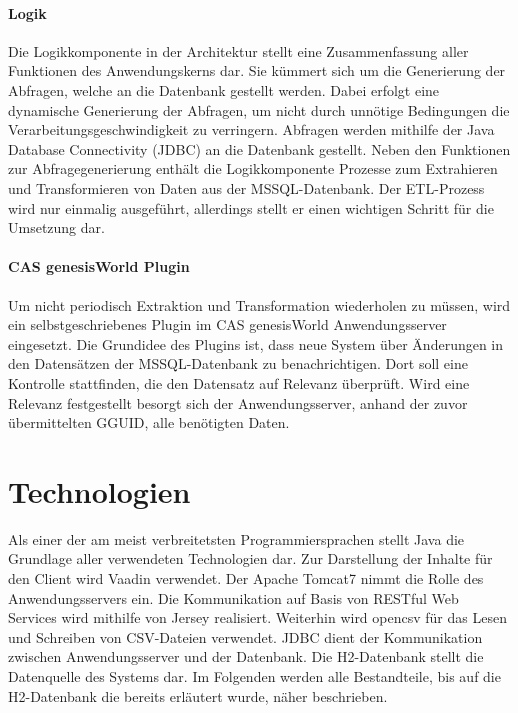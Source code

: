\paragraph{Logik}
Die Logikkomponente in der Architektur stellt eine Zusammenfassung aller Funktionen des Anwendungskerns dar. Sie kümmert sich um die Generierung der Abfragen, welche an die Datenbank gestellt werden. Dabei erfolgt eine dynamische Generierung der Abfragen, um nicht durch unnötige Bedingungen die Verarbeitungsgeschwindigkeit zu verringern. Abfragen werden mithilfe der Java Database Connectivity (JDBC) an die Datenbank gestellt. Neben den Funktionen zur Abfragegenerierung enthält die Logikkomponente Prozesse zum Extrahieren und Transformieren von Daten aus der MSSQL-Datenbank. Der ETL-Prozess wird nur einmalig ausgeführt, allerdings stellt er einen wichtigen  Schritt für die Umsetzung dar. 

\paragraph{CAS genesisWorld Plugin}
Um nicht periodisch Extraktion und Transformation wiederholen zu müssen, wird ein selbstgeschriebenes Plugin im CAS genesisWorld Anwendungsserver eingesetzt. Die Grundidee des Plugins ist, dass neue System über Änderungen in den Datensätzen der MSSQL-Datenbank zu benachrichtigen. Dort soll eine Kontrolle stattfinden, die den Datensatz auf Relevanz überprüft. Wird eine Relevanz festgestellt besorgt sich der Anwendungsserver, anhand der zuvor übermittelten GGUID, alle benötigten Daten.

\section{Technologien}

Als einer der am meist verbreitetsten Programmiersprachen stellt Java die Grundlage aller verwendeten Technologien dar. Zur Darstellung der Inhalte für den Client wird Vaadin verwendet. Der Apache Tomcat7 nimmt die Rolle des Anwendungsservers ein. Die Kommunikation auf Basis von RESTful Web Services wird mithilfe von Jersey realisiert. Weiterhin wird opencsv für das Lesen und Schreiben von CSV-Dateien verwendet. JDBC dient der Kommunikation zwischen Anwendungsserver und der Datenbank. Die H2-Datenbank stellt die Datenquelle des Systems dar. Im Folgenden werden alle Bestandteile, bis auf die H2-Datenbank die bereits erläutert wurde, näher beschrieben. 


